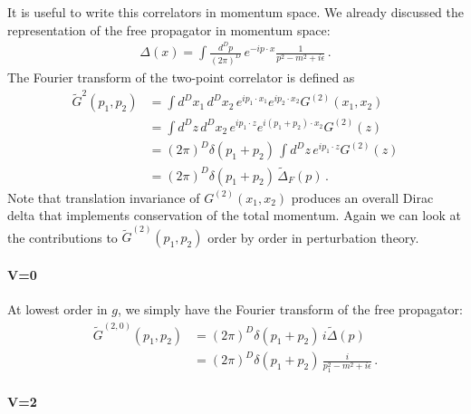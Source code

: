 It is useful to write this correlators in momentum space. We already
discussed the representation of the free propagator in momentum space: 
\begin{align}
  \Delta(x) = \int \frac{d^Dp}{(2\pi)^D}\, e^{-ip\cdot x}
  \frac{1}{p^2 - m^2 + i\epsilon}\, .
\end{align}
The Fourier transform of the two-point correlator is defined as
\begin{align}
  \tilde{G}^{2}\left(p_1,p_2\right) 
  &= 
    \int d^Dx_1\, d^Dx_2\, e^{ip_1\cdot x_1} e^{ip_2\cdot x_2} 
    G^{(2)}(x_1,x_2) \\
  &= \int d^Dz\, d^Dx_2\, e^{ip_1\cdot z} e^{i(p_1+p_2)\cdot x_2} G^{(2)}(z) \\
  &= \left(2\pi\right)^D \delta(p_1+p_2)\, \int d^Dz\, e^{ip_1\cdot z}
    G^{(2)}(z)  \\
  &= \left(2\pi\right)^D \delta(p_1+p_2)\, \tilde{\Delta}_F(p)\, .
\end{align}
Note that translation invariance of $G^{(2)}(x_1,x_2)$ produces an overall
Dirac delta that implements conservation of the total momentum. Again
we can look at the contributions to $\tilde{G}^{(2)}(p_1,p_2)$ order by
order in perturbation theory. 

\paragraph{V=0}

At lowest order in $g$, we simply have the Fourier transform of the
free propagator:
\begin{align}
  \tilde{G}^{(2,0)}(p_1,p_2) 
  &= 
    \left(2\pi\right)^D \delta(p_1+p_2)\,
    i \tilde{\Delta}(p) \\
  &=
    \left(2\pi\right)^D \delta(p_1+p_2)\,
    \frac{i}{p_1^2-m^2+i\epsilon}\, .
\end{align}

\paragraph{V=2}

